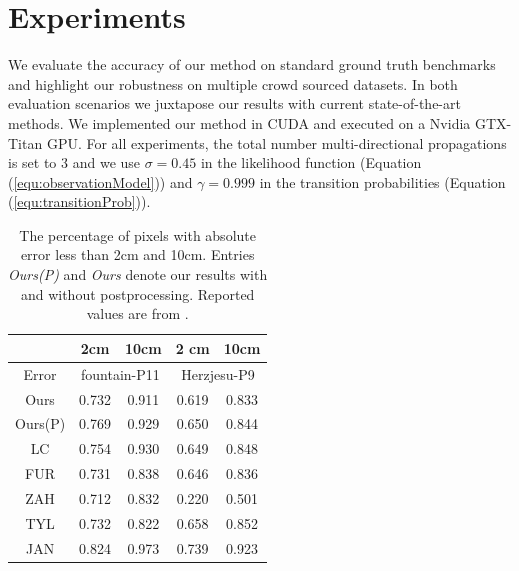  

\section{Experiments} \label{sec2:experiment}
We evaluate the accuracy of our method on standard ground truth benchmarks and highlight our robustness on multiple crowd sourced datasets.
In both evaluation scenarios we juxtapose our results with current state-of-the-art methods.
We implemented our method in CUDA and executed on a Nvidia GTX-Titan GPU.
For all experiments, the total number multi-directional propagations is set to 3 and we use  $\sigma = 0.45$ in the likelihood function (Equation (\ref{equ:observationModel})) and $\gamma=0.999$ in the transition probabilities (Equation (\ref{equ:transitionProb})).  %

\begin{table}[t]
\centering
    \begin{tabular}{|c|c|c|c|c|}
    \hline
         &  2cm &  10cm  & 2 cm & 10cm\\
    \hline
    Error & \multicolumn{2}{|c|}{fountain-P11} & \multicolumn{2}{|c|}{Herzjesu-P9}        \\
    \hline
    Ours & 0.732   & 0.911  & 0.619 & 0.833\\
    \hline
    Ours(P)& 0.769   & 0.929  & 0.650 & 0.844\\
    \hline
    LC \cite{LeastCommitment_3DIMPVT2012} & 0.754 &  {0.930} & 0.649 & 0.848 \\
    \hline
    FUR \cite{FURUKAWA_PAMI2010} & 0.731 & 0.838 & 0.646  & 0.836\\
    \hline
    ZAH \cite{Zaharescu_PAMI2011} & 0.712 & 0.832 & 0.220 & 0.501\\
    \hline
    TYL \cite{TYL} &0.732 & 0.822 & 0.658 & 0.852\\
    \hline
    JAN \cite{JAN} &0.824 & 0.973 & 0.739 & 0.923\\
    \hline
    \end{tabular}
\caption{The percentage of pixels with absolute error less than 2cm and 10cm. Entries {\em Ours(P)}  and {\em Ours}  denote our results with and without postprocessing.  Reported values are from \citet{LeastCommitment_3DIMPVT2012}.}
\label{tab:data}
\end{table}

